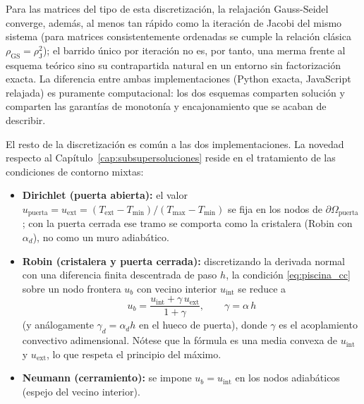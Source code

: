 \begin{itemize}
Para las matrices del tipo de esta discretización, la relajación
Gauss-Seidel converge, además, al menos tan rápido como la iteración de Jacobi
del mismo sistema (para matrices consistentemente ordenadas se cumple la
relación clásica $\rho_{\mathrm{GS}} = \rho_{\mathrm{J}}^{2}$); el barrido
único por iteración no es, por tanto, una merma frente al esquema teórico sino
su contrapartida natural en un entorno sin factorización exacta. La diferencia entre ambas implementaciones
(Python exacta, JavaScript relajada) es puramente computacional: los dos
esquemas comparten solución y comparten las garantías de monotonía y
encajonamiento que se acaban de describir.

El resto de la discretización es común a las dos implementaciones. La novedad
respecto al Capítulo~\ref{cap:subsupersoluciones} reside en el tratamiento de
las condiciones de contorno mixtas:

\begin{itemize}
  \item \textbf{Dirichlet (puerta abierta):} el valor
  $u_{\mathrm{puerta}} = u_{\mathrm{ext}} = (T_{\mathrm{ext}}-T_{\min})/(T_{\max}-T_{\min})$
  se fija en los nodos de $\partial\Omega_{\mathrm{puerta}}$; con la puerta
  cerrada ese tramo se comporta como la cristalera (Robin con $\alpha_d$), no
  como un muro adiabático.

  \item \textbf{Robin (cristalera y puerta cerrada):} discretizando la derivada
  normal con una diferencia finita descentrada de paso $h$, la condición
  \eqref{eq:piscina_cc} sobre un nodo frontera $u_b$ con vecino interior
  $u_{\mathrm{int}}$ se reduce a
  \begin{equation}\label{eq:piscina_robin_discreta}
    u_b = \frac{u_{\mathrm{int}} + \gamma\, u_{\mathrm{ext}}}{1 + \gamma},
    \qquad \gamma = \alpha\, h
  \end{equation}
  (y análogamente $\gamma_d = \alpha_d h$ en el hueco de puerta), donde $\gamma$
  es el acoplamiento convectivo adimensional. Nótese que la fórmula es una media
  convexa de $u_{\mathrm{int}}$ y $u_{\mathrm{ext}}$, lo que respeta el principio
  del máximo.

  \item \textbf{Neumann (cerramiento):} se impone $u_b = u_{\mathrm{int}}$ en
  los nodos adiabáticos (espejo del vecino interior).
\end{itemize}


\end{itemize}
